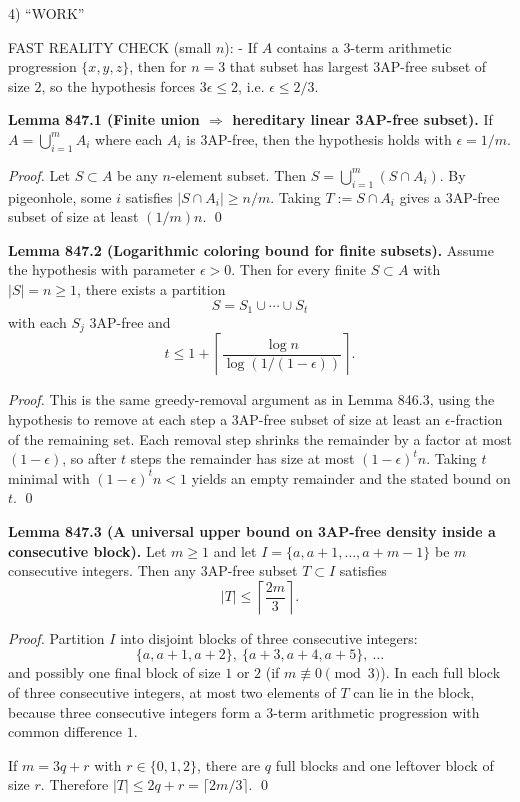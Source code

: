 4) “WORK”

FAST REALITY CHECK (small $n$):
- If $A$ contains a 3-term arithmetic progression $\{x,y,z\}$, then for $n=3$ that subset has largest 3AP-free subset of size $2$, so the hypothesis forces $3\epsilon\le 2$, i.e. $\epsilon\le 2/3$.

\textbf{Lemma 847.1 (Finite union $\Rightarrow$ hereditary linear 3AP-free subset).}
If $A=\bigcup_{i=1}^m A_i$ where each $A_i$ is 3AP-free, then the hypothesis holds with $\epsilon=1/m$.

\emph{Proof.}
Let $S\subset A$ be any $n$-element subset. Then $S=\bigcup_{i=1}^m (S\cap A_i)$. By pigeonhole, some $i$ satisfies $|S\cap A_i|\ge n/m$. Taking $T:=S\cap A_i$ gives a 3AP-free subset of size at least $(1/m)n$. \qed

\textbf{Lemma 847.2 (Logarithmic coloring bound for finite subsets).}
Assume the hypothesis with parameter $\epsilon>0$. Then for every finite $S\subset A$ with $|S|=n\ge 1$, there exists a partition
\[
S = S_1\cup\cdots\cup S_t
\]
with each $S_j$ 3AP-free and
\[
 t \le 1+\left\lceil \frac{\log n}{\log(1/(1-\epsilon))}\right\rceil.
\]

\emph{Proof.}
This is the same greedy-removal argument as in Lemma 846.3, using the hypothesis to remove at each step a 3AP-free subset of size at least an $\epsilon$-fraction of the remaining set. Each removal step shrinks the remainder by a factor at most $(1-\epsilon)$, so after $t$ steps the remainder has size at most $(1-\epsilon)^t n$. Taking $t$ minimal with $(1-\epsilon)^t n<1$ yields an empty remainder and the stated bound on $t$. \qed

\textbf{Lemma 847.3 (A universal upper bound on 3AP-free density inside a consecutive block).}
Let $m\ge 1$ and let $I=\{a,a+1,\dots,a+m-1\}$ be $m$ consecutive integers. Then any 3AP-free subset $T\subset I$ satisfies
\[
|T|\le \left\lceil \frac{2m}{3}\right\rceil.
\]

\emph{Proof.}
Partition $I$ into disjoint blocks of three consecutive integers:
\[
\{a,a+1,a+2\},\ \{a+3,a+4,a+5\},\ \dots
\]
and possibly one final block of size $1$ or $2$ (if $m\not\equiv 0\pmod 3$). In each full block of three consecutive integers, at most two elements of $T$ can lie in the block, because three consecutive integers form a 3-term arithmetic progression with common difference $1$.

If $m=3q+r$ with $r\in\{0,1,2\}$, there are $q$ full blocks and one leftover block of size $r$. Therefore $|T|\le 2q+r=\lceil 2m/3\rceil$. \qed

